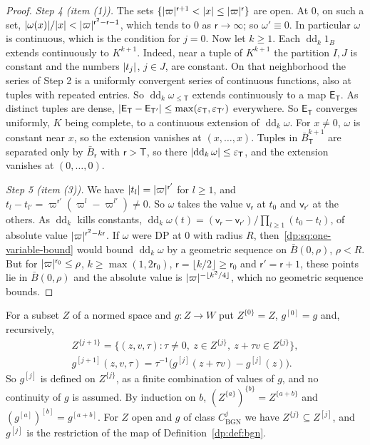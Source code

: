 \begin{proof}
\emph{Step 4 (item (1)).} The sets $\{\lvert \varpi\rvert^{\mathsf r+1}<\lvert x\rvert\le\lvert \varpi\rvert^{\mathsf r}\}$ are open. At $0$, on such a set, $\lvert \omega(x)\rvert/\lvert x\rvert<\lvert \varpi\rvert^{\mathsf r^2-\mathsf r-1}$, which tends to $0$ as $\mathsf r\to\infty$; so $\omega'\equiv0$. In particular $\omega$ is continuous, which is the condition for $j=0$. Now let $k\ge1$. Each $\operatorname{dd}_k1_B$ extends continuously to $K^{k+1}$. Indeed, near a tuple of $K^{k+1}$ the partition $I,J$ is constant and the numbers $\lvert t_j\rvert$, $j\in J$, are constant. On that neighborhood the series of Step 2 is a uniformly convergent series of continuous functions, also at tuples with repeated entries. So $\operatorname{dd}_k\omega_{\le\mathsf T}$ extends continuously to a map $\mathsf E_{\mathsf T}$. As distinct tuples are dense, $\lvert \mathsf E_{\mathsf T}-\mathsf E_{\mathsf T'}\rvert\le\max(\varepsilon_{\mathsf T},\varepsilon_{\mathsf T'})$ everywhere. So $\mathsf E_{\mathsf T}$ converges uniformly, $K$ being complete, to a continuous extension of $\operatorname{dd}_k\omega$. For $x\ne0$, $\omega$ is constant near $x$, so the extension vanishes at $(x,\dots,x)$. Tuples in $\bar B_{\mathsf T}^{k+1}$ are separated only by $\bar B_{\mathsf r}$ with $\mathsf r>\mathsf T$, so there $\lvert \operatorname{dd}_k\omega\rvert\le\varepsilon_{\mathsf T}$, and the extension vanishes at $(0,\dots,0)$.

\emph{Step 5 (item (3)).} We have $\lvert t_l\rvert=\lvert \varpi\rvert^{\mathsf r'}$ for $l\ge1$, and $t_l-t_{l'}=\varpi^{\mathsf r'}(\varpi^l-\varpi^{l'})\ne0$. So $\omega$ takes the value $\mathsf v_{\mathsf r}$ at $t_0$ and $\mathsf v_{\mathsf r'}$ at the others. As $\operatorname{dd}_k$ kills constants, $\operatorname{dd}_k\omega(t)=(\mathsf v_{\mathsf r}-\mathsf v_{\mathsf r'})/\prod_{l\ge1}(t_0-t_l)$, of absolute value $\lvert \varpi\rvert^{\mathsf r^2-k\mathsf r}$. If $\omega$ were DP at $0$ with radius $R$, then~\eqref{dp:sq:one-variable-bound} would bound $\operatorname{dd}_k\omega$ by a geometric sequence on $\bar B(0,\rho)$, $\rho<R$. But for $\lvert \varpi\rvert^{\mathsf r_0}\le\rho$, $k\ge\max(1,2\mathsf r_0)$, $\mathsf r=\lfloor k/2\rfloor\ge\mathsf r_0$ and $\mathsf r'=\mathsf r+1$, these points lie in $\bar B(0,\rho)$ and the absolute value is $\lvert \varpi\rvert^{-\lfloor k^2/4\rfloor}$, which no geometric sequence bounds.
\end{proof}

For a subset $Z$ of a normed space and $g\colon Z\to W$ put $Z^{\{0\}}=Z$, $g^{[0]}=g$ and, recursively,
\begin{gather*}
 Z^{\{j+1\}}=\{(z,v,\tau):\tau\ne0,\ z\in Z^{\{j\}},\ z+\tau v\in Z^{\{j\}}\},\\
 g^{[j+1]}(z,v,\tau)=\tau^{-1}\bigl(g^{[j]}(z+\tau v)-g^{[j]}(z)\bigr).
\end{gather*}
So $g^{[j]}$ is defined on $Z^{\{j\}}$, as a finite combination of values of $g$, and no continuity of $g$ is assumed. By induction on $b$, $(Z^{\{a\}})^{\{b\}}=Z^{\{a+b\}}$ and $(g^{[a]})^{[b]}=g^{[a+b]}$. For $Z$ open and $g$ of class $C^j_{\mathrm{BGN}}$ we have $Z^{\{j\}}\subseteq Z^{[j]}$, and $g^{[j]}$ is the restriction of the map of Definition~\ref{dp:def:bgn}.

